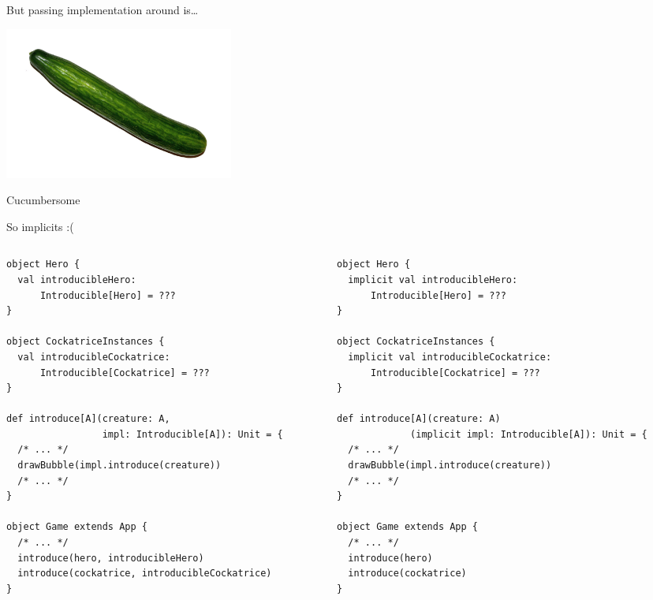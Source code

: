 \documentclass[presentation,aspectratio=169,smaller]{beamer}
\begin{document}
\begin{frame}[label={sec:orgb5dd0c0}]{But passing implementation around is\ldots{}}
\begin{center}
\includegraphics[height=5cm]{images/cucumber.jpg}
\end{center}

Cucumbersome
\end{frame}

\begin{frame}[label={sec:org9f05212},fragile]{So implicits :(}
 \begin{columns}
\begin{column}[t]{0.5\columnwidth}
\begin{verbatim}
object Hero {
  val introducibleHero:
      Introducible[Hero] = ???
}

object CockatriceInstances {
  val introducibleCockatrice:
      Introducible[Cockatrice] = ???
}

def introduce[A](creature: A,
                 impl: Introducible[A]): Unit = {
  /* ... */
  drawBubble(impl.introduce(creature))
  /* ... */
}

object Game extends App {
  /* ... */
  introduce(hero, introducibleHero)
  introduce(cockatrice, introducibleCockatrice)
}
\end{verbatim}

\pause
\end{column}

\begin{column}[t]{0.5\columnwidth}
\begin{verbatim}
object Hero {
  implicit val introducibleHero:
      Introducible[Hero] = ???
}

object CockatriceInstances {
  implicit val introducibleCockatrice:
      Introducible[Cockatrice] = ???
}

def introduce[A](creature: A)
             (implicit impl: Introducible[A]): Unit = {
  /* ... */
  drawBubble(impl.introduce(creature))
  /* ... */
}

object Game extends App {
  /* ... */
  introduce(hero)
  introduce(cockatrice)
}
\end{verbatim}
\end{column}
\end{columns}
\end{frame}
\end{document}

